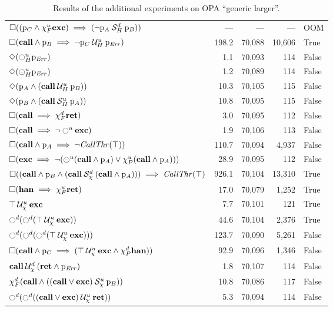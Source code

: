 \documentclass[9pt,a4paper]{article}
\begin{document}
\begin{table}[tb]
\begin{tabular}{| l | r | r | r | l |}
$\square ((\mathrm{p}_C \land \chi_F^{u} \mathbf{exc}) \implies ({\neg \mathrm{p}_A} \mathbin{\mathcal{S}_H^d} {\mathrm{p}_B}))$ 	&	---	&	---	&	---	&	OOM	\\
$\square (\mathbf{call} \land \mathrm{p}_B \implies {\neg \mathrm{p}_C} \mathbin{\mathcal{U}_H^u} {\mathrm{p}_\mathit{Err}})$ 	&	198.2	&	70,088	&	10,606	&	True	\\
$\Diamond (\ocircle_H^{u} \mathrm{p}_\mathit{Err})$ 	&	1.1	&	70,093	&	114	&	False	\\
$\Diamond (\circleddash_H^{u} \mathrm{p}_\mathit{Err})$ 	&	1.2	&	70,089	&	114	&	False	\\
$\Diamond (\mathrm{p}_A \land ({\mathbf{call}} \mathbin{\mathcal{U}_H^u} {\mathrm{p}_B}))$ 	&	10.3	&	70,105	&	115	&	False	\\
$\Diamond (\mathrm{p}_B \land ({\mathbf{call}} \mathbin{\mathcal{S}_H^u} {\mathrm{p}_A}))$ 	&	10.8	&	70,095	&	115	&	False	\\
$\square (\mathbf{call} \implies \chi_F^{d} \mathbf{ret})$ 	&	3.0	&	70,095	&	112	&	False	\\
$\square (\mathbf{call} \implies \neg \ocircle^u \mathbf{exc})$ 	&	1.9	&	70,106	&	113	&	False	\\
$\square (\mathbf{call} \land \mathrm{p}_A \implies \neg \mathit{CallThr}(\top))$ 	&	110.7	&	70,094	&	4,937	&	False	\\
$\square (\mathbf{exc} \implies \neg (\circleddash^u (\mathbf{call} \land \mathrm{p}_A) \lor \chi_P^{u} (\mathbf{call} \land \mathrm{p}_A)))$ 	&	28.9	&	70,095	&	112	&	False	\\
$\square ((\mathbf{call} \land \mathrm{p}_B \land ({\mathbf{call}} \mathbin{\mathcal{S}_\chi^d} {(\mathbf{call} \land \mathrm{p}_A)})) \implies \mathit{CallThr}(\top)$ 	&	926.1	&	70,104	&	13,310	&	True	\\
$\square (\mathbf{han} \implies \chi_F^{u} \mathbf{ret})$ 	&	17.0	&	70,079	&	1,252	&	True	\\
${\top} \mathbin{\mathcal{U}_\chi^u} {\mathbf{exc}}$ 	&	7.7	&	70,101	&	121	&	True	\\
$\ocircle^d (\ocircle^d ({\top} \mathbin{\mathcal{U}_\chi^u} {\mathbf{exc}}))$ 	&	44.6	&	70,104	&	2,376	&	True	\\
$\ocircle^d (\ocircle^d (\ocircle^d ({\top} \mathbin{\mathcal{U}_\chi^u} {\mathbf{exc}})))$ 	&	123.7	&	70,090	&	5,261	&	False	\\
$\square (\mathbf{call} \land \mathrm{p}_C \implies ({\top} \mathbin{\mathcal{U}_\chi^u} {\mathbf{exc} \land \chi_P^{d} \mathbf{han}}))$ 	&	92.9	&	70,096	&	1,346	&	False	\\
${\mathbf{call}} \mathbin{\mathcal{U}_\chi^d} {(\mathbf{ret} \land \mathrm{p}_\mathit{Err})}$ 	&	1.8	&	70,107	&	114	&	False	\\
$\chi_F^{d} (\mathbf{call} \land ({(\mathbf{call} \lor \mathbf{exc})} \mathbin{\mathcal{S}_\chi^u} {\mathrm{p}_B}))$ 	&	10.8	&	70,086	&	117	&	False	\\
$\ocircle^d (\ocircle^d ({(\mathbf{call} \lor \mathbf{exc})} \mathbin{\mathcal{U}_\chi^u} {\mathbf{ret}}))$ 	&	5.3	&	70,094	&	114	&	False	\\
\hline
\end{tabular}
\caption{Results of the additional experiments on OPA ``generic larger''.}
\label{tab:more-exp-large}
\end{table}
\end{document}
